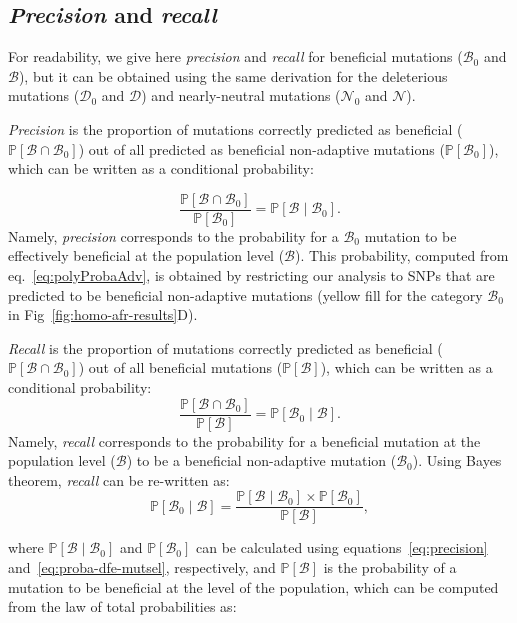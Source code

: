 \documentclass[10pt,letterpaper]{article}
\newcommand{\proba}{\mathbb{P}}
\newcommand{\SphyDel}{\mathcal{D}_0}
\newcommand{\SphyNeu}{\mathcal{N}_0}
\newcommand{\SphyBen}{\mathcal{B}_0}
\newcommand{\given}{\mid}
\newcommand{\SpopDel}{\mathcal{D}}
\newcommand{\SpopNeu}{\mathcal{N}}
\newcommand{\SpopBen}{\mathcal{B}}
\newcommand{\ProbaPopBen}{\proba [ \SpopBen ]}
\begin{document}
\subsection{\textit{Precision} and \textit{recall}}
\label{subsec:precisison_recall}
For readability, we give here \textit{precision} and \textit{recall} for beneficial mutations ($\SphyBen$ and $\SpopBen$), but it can be obtained using the same derivation for the deleterious mutations ($\SphyDel$ and $\SpopDel$) and nearly-neutral mutations ($\SphyNeu$ and $\SpopNeu$).

\textit{Precision} is the proportion of mutations correctly predicted as beneficial ($\proba [ \SpopBen \cap  \SphyBen]$) out of all predicted as beneficial non-adaptive mutations ($\proba [ \SphyBen]$), which can be written as a conditional probability:

\begin{equation}
\frac{\proba [ \SpopBen  \cap  \SphyBen]}{\proba [ \SphyBen]} = \proba [ \SpopBen \given \SphyBen].
\label{eq:precision}
\end{equation}
Namely, \textit{precision} corresponds to the probability for a $\SphyBen$ mutation to be effectively beneficial at the population level ($\SpopBen$).
This probability, computed from eq.~\ref{eq:polyProbaAdv}, is obtained by restricting our analysis to SNPs that are predicted to be beneficial non-adaptive mutations (yellow fill for the category $\SphyBen$ in Fig~\ref{fig:homo-afr-results}D).

\textit{Recall} is the proportion of mutations correctly predicted as beneficial ($\proba [ \SpopBen \cap  \SphyBen]$) out of all beneficial mutations ($\proba [ \SpopBen]$), which can be written as a conditional probability:
\begin{equation}
\frac{\proba [ \SpopBen \cap  \SphyBen]}{\proba [ \SpopBen]} = \proba [ \SphyBen  \given \SpopBen ].
\end{equation}
Namely, \textit{recall} corresponds to the probability for a beneficial mutation at the population level ($\SpopBen$) to be a beneficial non-adaptive mutation ($\SphyBen$).
Using Bayes theorem, \textit{recall} can be re-written as:
\begin{equation}
\proba [\SphyBen \given \SpopBen] = \frac{\proba [\SpopBen \given \SphyBen] \times \proba[\SphyBen]}{\ProbaPopBen},
\label{eq:bayes}
\end{equation}

where $\proba [\SpopBen \given \SphyBen]$ and $\proba [ \SphyBen ]$ can be calculated using equations~\ref{eq:precision} and~\ref{eq:proba-dfe-mutsel}, respectively, and $\proba [ \SpopBen ]$ is the probability of a mutation to be beneficial at the level of the population, which can be computed from the law of total probabilities as:
\end{document}
